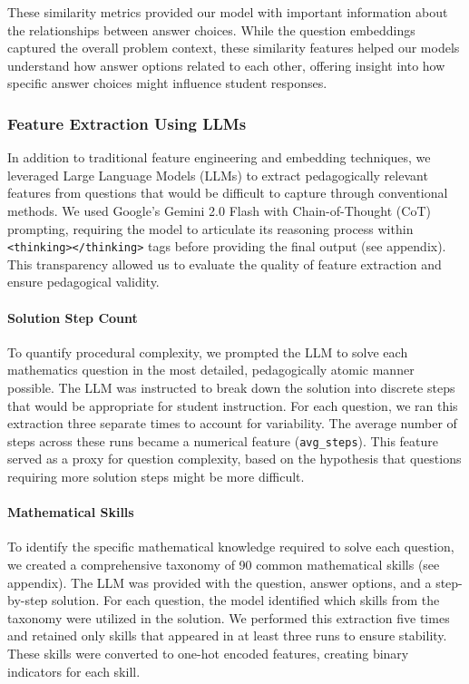 \documentclass[11pt]{article}
\begin{document}
These similarity metrics provided our model with important information about the relationships between answer choices. While the question embeddings captured the overall problem context, these similarity features helped our models understand how answer options related to each other, offering insight into how specific answer choices might influence student responses.

\subsubsection{Feature Extraction Using LLMs}

In addition to traditional feature engineering and embedding techniques, we leveraged Large Language Models (LLMs) to extract pedagogically relevant features from questions that would be difficult to capture through conventional methods. We used Google's Gemini 2.0 Flash with Chain-of-Thought (CoT) prompting, requiring the model to articulate its reasoning process within \texttt{<thinking></thinking>} tags before providing the final output (see appendix). This transparency allowed us to evaluate the quality of feature extraction and ensure pedagogical validity.

\paragraph{Solution Step Count}
To quantify procedural complexity, we prompted the LLM to solve each mathematics question in the most detailed, pedagogically atomic manner possible. The LLM was instructed to break down the solution into discrete steps that would be appropriate for student instruction. For each question, we ran this extraction three separate times to account for variability. The average number of steps across these runs became a numerical feature (\texttt{avg\_steps}). This feature served as a proxy for question complexity, based on the hypothesis that questions requiring more solution steps might be more difficult.

\paragraph{Mathematical Skills}
To identify the specific mathematical knowledge required to solve each question, we created a comprehensive taxonomy of 90 common mathematical skills (see appendix). The LLM was provided with the question, answer options, and a step-by-step solution. For each question, the model identified which skills from the taxonomy were utilized in the solution. We performed this extraction five times and retained only skills that appeared in at least three runs to ensure stability. These skills were converted to one-hot encoded features, creating binary indicators for each skill.
\end{document}
